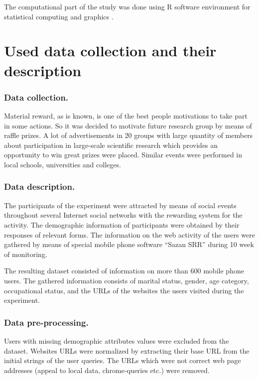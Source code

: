 \documentclass[runningheads,a4paper]{llncs}
\begin{document}
The computational part of the study was done using R software environment for statistical computing and graphics \cite{r-project}.


\section{Used data collection and their description}\label{the-description}


\subsubsection{Data collection.}
Material reward, as is known, is one of the best people motivations to take part in some actions. So it was decided to motivate future research group by means of raffle prizes.
A lot of advertisements in 20 groups with large quantity of members about participation in large-scale scientific research which provides an opportunity to win great prizes were placed. Similar events were performed in local schools, universities and colleges.


\subsubsection{Data description.}

The participants of the experiment were attracted by means of social events throughout several Internet social networks with the rewarding system for the activity.  The demographic information of participants were obtained by their responses of relevant forms. The information on the web activity of the users were gathered by means of special mobile phone software ``Sazan SRR'' during 10 week of monitoring.

The resulting dataset consisted of information on more than 600 mobile phone users. The gathered information consists of marital status, gender, age category, occupational status, and the URLs of the websites the users visited during the experiment.

\subsubsection{Data pre-processing.}\label{the-treatment}
Users with missing demographic attributes values were excluded from the dataset. Websites URLs were normalized by extracting their base URL from the initial strings of the user queries. The URLs which were not correct web page addresses (appeal to local data, chrome-queries etc.) were removed. 
\end{document}
